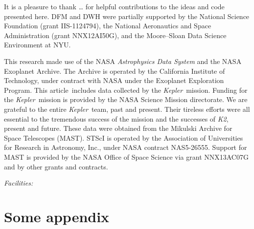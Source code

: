 \documentclass[12pt,preprint]{aastex}
\newcommand{\project}[1]{\textsl{#1}}
\newcommand{\kepler}{\project{Kepler}}
\newcommand{\KT}{\project{K2}}
\newcommand{\paper}{article}
\newcommand{\figlabel}[1]{\label{fig:#1}}
\begin{document}
\acknowledgments
It is a pleasure to thank
\ldots
for helpful contributions to the ideas and code presented here.
DFM and DWH were partially supported by the National Science Foundation
(grant IIS-1124794),
the National Aeronautics and Space Administration
(grant NNX12AI50G), and the Moore--Sloan Data Science Environment at NYU.

This research made use of the NASA \project{Astrophysics Data System} and the
NASA Exoplanet Archive.
The Archive is operated by the California Institute of Technology, under
contract with NASA under the Exoplanet Exploration Program.
This \paper\ includes data collected by the \kepler\ mission. Funding for the
\kepler\ mission is provided by the NASA Science Mission directorate.
We are grateful to the entire \kepler\ team, past and present.
Their tireless efforts were all essential to the tremendous success of the mission
and the successes of \KT, present and future.
These data were obtained from the Mikulski Archive for Space Telescopes
(MAST).
STScI is operated by the Association of Universities for Research in
Astronomy, Inc., under NASA contract NAS5-26555.
Support for MAST is provided by the NASA Office of Space Science via grant
NNX13AC07G and by other grants and contracts.

{\it Facilities:} 

\appendix

\section{Some appendix}

\clearpage

\clearpage


\end{document}
